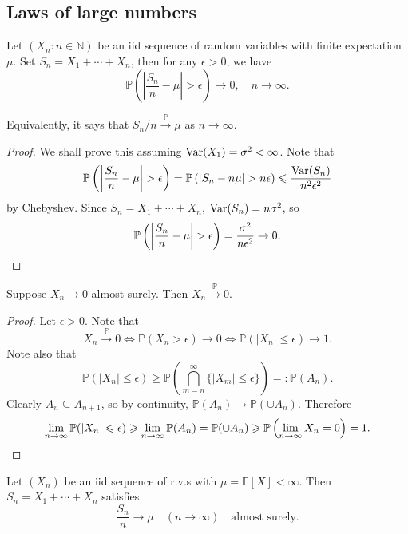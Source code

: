 \subsection{Laws of large numbers}
\begin{theorem}\label{thm:Weak law of large numbers}
    Let $(X_n:n\in\mathbb N)$ be an iid sequence of random variables with finite expectation $\mu$.
    Set $S_n=X_1+\cdots+X_n$, then for any $\epsilon>0$, we have
    $$\mathbb P\left( \left|\frac{S_n}{n}-\mu\right|>\epsilon \right)\to 0,\quad n\to\infty.$$
\end{theorem}
\begin{note}
    Equivalently, it says that $S_n/n\xrightarrow{\mathbb P}\mu$ as $n\to\infty$.
\end{note}
\begin{proof}
    We shall prove this assuming $\var (X_1)=\sigma^2<\infty$. Note that 
    \[
        \mathbb{P}\left( \left| \frac{S_n}{n}-\mu \right| >\epsilon \right) = \mathbb{P}\left( \left| S_n-n\mu \right| >n\epsilon \right) \le \frac{\var(S_n)}{n^2 \epsilon^2}
    \]
    by Chebyshev. Since $ S_n=X_1+\cdots+X_n $, $ \var(S_n)=n\sigma^2 $, so 
    \[
        \mathbb{P}\left( \left| \frac{S_n}{n}-\mu \right| >\epsilon \right)=\frac{\sigma^2}{n\epsilon^2}\to 0.\qedhere
    \]
\end{proof}
\begin{proposition}
    Suppose $ X_n\to 0 $ almost surely. Then $ X_n \xrightarrow{\mathbb{P}} 0$.
\end{proposition}
\begin{proof}
    Let $ \epsilon>0 $. Note that
    \[
        X_n \xrightarrow{\mathbb{P}}0 \Longleftrightarrow \mathbb{P}(X_n>\epsilon)\to 0 \Longleftrightarrow \mathbb{P}(|X_n|\le \epsilon)\to 1.
    \]
    Note also that 
    \[
        \mathbb{P}(|X_n|\le \epsilon)\ge \mathbb{P}\left( \bigcap_{m=n}^{\infty}\{|X_m|\le \epsilon\} \right) =: \mathbb{P}(A_n). 
    \]
    Clearly $A_n \subseteq A_{n+1}$, so by continuity, $ \mathbb{P}(A_n) \to \mathbb{P}(\cup A_n) $. Therefore 
    \[
        \lim_{n \to \infty} \mathbb{P}(|X_n|\le \epsilon) \ge \lim_{n \to \infty} \mathbb{P}(A_n) = \mathbb{P}(\cup A_n)\ge \mathbb{P}\left( \lim_{n \to \infty} X_n=0 \right)=1.\qedhere
    \]
\end{proof}
\begin{theorem}\label{thm:Strong law of large numbers}
    Let $ (X_n) $ be an iid sequence of r.v.s with $ \mu=\mathbb{E}[X]<\infty  $. Then $ S_n=X_1+\cdots+X_n $ satisfies 
    \[
        \frac{S_n}{n}\to \mu\quad (n\to \infty) \quad \text{almost surely}.
    \]
\end{theorem}
